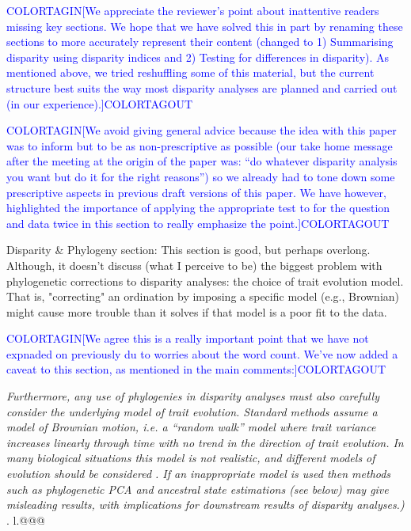 \documentclass[12pt,letterpaper]{article}
\begin{document}

\textcolor{blue}{COLORTAGIN[We appreciate the reviewer's point about inattentive readers missing key sections. We hope that we have solved this in part by renaming these sections to more accurately represent their content (changed to 1) Summarising disparity using disparity indices and 2) Testing for differences in disparity). As mentioned above, we tried reshuffling some of this material, but the current structure best suits the way most disparity analyses are planned and carried out (in our experience).]COLORTAGOUT} 

\textcolor{blue}{COLORTAGIN[We avoid giving general advice because the idea with this paper was to inform but to be as non-prescriptive as possible (our take home message after the meeting at the origin of the paper was: ``do whatever disparity analysis you want but do it for the right reasons'') so we already had to tone down some prescriptive aspects in previous draft versions of this paper. We have however, highlighted the importance of applying the appropriate test to for the question and data twice in this section to really emphasize the point.]COLORTAGOUT}


\noindent Disparity \& Phylogeny section: This section is good, but perhaps overlong. Although, it doesn't discuss (what I perceive to be) the biggest problem with phylogenetic corrections to disparity analyses: the choice of trait evolution model.
That is, "correcting" an ordination by imposing a specific model (e.g., Brownian) might cause more trouble than it solves if that model is a poor fit to the data.

\textcolor{blue}{COLORTAGIN[We agree this is a really important point that we have not expnaded on previously du to worries about the word count. We've now added a caveat to this section, as mentioned in the main comments:]COLORTAGOUT}

\textit{Furthermore, any use of phylogenies in disparity analyses must also carefully consider the underlying model of trait evolution. Standard methods assume a model of Brownian motion, i.e. a ``random walk'' model where trait variance increases linearly through time with no trend in the direction of trait evolution. In many biological situations this model is not realistic, and different models of evolution should be considered \citealt{blomberg2020}. If an inappropriate model is used then methods such as phylogenetic PCA and ancestral state estimations (see below) may give misleading results, with implications for downstream results of disparity analyses.)} . l.@@@
\end{document}
